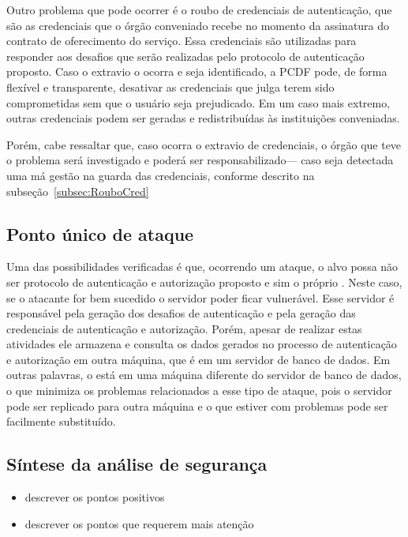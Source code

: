 Outro problema que pode ocorrer é o roubo de credenciais de autenticação, que são as credenciais que o órgão conveniado recebe no momento da assinatura do contrato de oferecimento do serviço. Essa credenciais são utilizadas para responder aos desafios que serão realizadas pelo protocolo de autenticação proposto. Caso o extravio o ocorra e seja identificado, a PCDF pode, de forma flex\'{i}vel e transparente, desativar as credenciais que julga terem sido comprometidas sem que o usuário seja prejudicado.
Em um caso mais extremo, outras credenciais podem ser geradas e redistribuídas \`{a}s institui\c c\~{o}es conveniadas.

Porém, cabe ressaltar que, caso ocorra o extravio de credenciais, o órgão que teve o problema será investigado e poderá ser responsabilizado--- caso seja detectada uma m\'{a}
gestão na guarda das credenciais, conforme descrito na subseção~\ref{subsec:RouboCred}


\subsection{Ponto único de ataque}

Uma das possibilidades verificadas é que, ocorrendo um ataque, o alvo possa não ser protocolo de autenticação e autorização proposto e sim o próprio \servidorAA.
Neste caso, se o atacante for bem sucedido o servidor poder ficar vulnerável. Esse servidor é responsável pela geração dos desafios de autenticação e pela geração das credenciais de autenticação e autorização. Porém, apesar de realizar estas atividades ele armazena e consulta os dados gerados no processo de autenticação e autorização em outra máquina, que é em um servidor de banco de dados. Em outras palavras, o \servidorAA está em uma máquina diferente do servidor de banco de dados, o que minimiza os problemas relacionados a esse tipo de ataque, pois o servidor pode ser replicado para outra máquina e o que estiver com problemas pode ser facilmente substituído.

\subsection{S\'{i}ntese da an\'{a}lise de seguran\c ca}

\begin{itemize}
\item descrever os pontos positivos
\item descrever os pontos que requerem mais aten\c c\~{a}o
\end{itemize}

